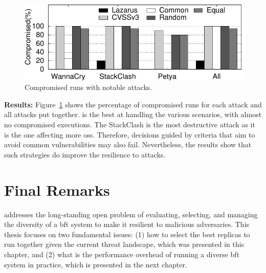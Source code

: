 \begin{figure}[h]
\begin{center}
\includegraphics[width=\columnwidth]{images/gnuplot/attacks/attacks.pdf}
\caption{Compromised runs with notable attacks.}
\label{fig:special_vulns}
\end{center}
\end{figure}

\textbf{Results:}
Figure~\ref{fig:special_vulns} shows the percentage of compromised runs for each attack and all attacks put together.
\system is the best at handling the various scenarios, with almost no compromised executions.
The StackClash is the most destructive attack as it is the one affecting more \glspl{os}.
Therefore, decisions guided by criteria that aim to avoid common vulnerabilities may also fail. 
Nevertheless, the results show that such strategies do improve the resilience to attacks.



\section{Final Remarks}
\label{sec:finalremarkslazarusdesign}

\system addresses the long-standing open problem of evaluating, selecting, and managing the diversity of a \gls{bft} system to make it resilient to malicious adversaries.
This thesis focuses on two fundamental issues: (1) how to select the best replicas to run together given the current threat landscape, which was presented in this chapter, and (2) what is the performance overhead of running a diverse \gls{bft} system in practice, which is presented in the next chapter.

